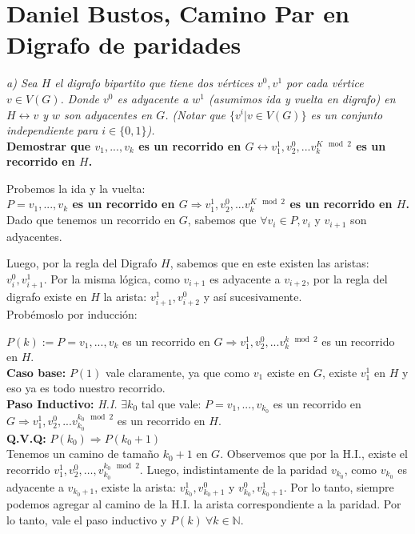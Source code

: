 \documentclass{article}
\begin{document}
\section{Daniel Bustos, Camino Par en Digrafo de paridades}
\textit{a) Sea $H$ el digrafo bipartito que tiene dos vértices $v^0, v^1$ por cada vértice $v \in V(G)$. Donde $v^0$ es adyacente a $w^1$ (asumimos ida y vuelta en digrafo) en $H \leftrightarrow v$ y $w$ son adyacentes en $G$. (Notar que $\{v^i | v \in V(G)\}$ es un conjunto independiente para $i \in \{0,1\}$).}\\

\textbf{Demostrar que $v_1,...,v_k$ es un recorrido en $G \leftrightarrow v^1_1,v^0_2,...v^{K \mod 2}_k$ es un recorrido en $H$.}

Probemos la ida y la vuelta:\\

\textbf{$P = v_1,...,v_k$ es un recorrido en $G \Rightarrow v^1_1,v^0_2,...v^{K \mod 2}_k$ es un recorrido en $H$.}\\

Dado que tenemos un recorrido en $G$, sabemos que $\forall v_i \in P, v_i$ y $v_{i+1}$ son adyacentes.

Luego, por la regla del Digrafo $H$, sabemos que en este existen las aristas: $v^0_i,v^1_{i+1}$. Por la misma lógica, como $v_{i+1}$ es adyacente a $v_{i+2}$, por la regla del digrafo existe en $H$ la arista: $v^1_{i+1},v^0_{i+2}$ y así sucesivamente.\\

Probémoslo por inducción:

$P(k) := P = v_1,...,v_k$ es un recorrido en $G \Rightarrow v^1_1,v^0_2,...v^{k \mod 2}_k$ es un recorrido en $H$.\\

\textbf{Caso base:}
$P(1)$ vale claramente, ya que como $v_1$ existe en $G$, existe $v^1_1$ en $H$ y eso ya es todo nuestro recorrido.\\

\textbf{Paso Inductivo:}
\textit{H.I.} $\exists k_0$ tal que vale: $P = v_1,...,v_{k_0}$ es un recorrido en $G \Rightarrow v^1_1,v^0_2,...v^{k_0 \mod 2}_{k_0}$ es un recorrido en $H$.\\

\textbf{Q.V.Q:} $P(k_0) \Rightarrow P(k_0 + 1)$ \\

Tenemos un camino de tamaño $k_0 + 1$ en $G$. Observemos que por la H.I., existe el recorrido $v^1_1,v^0_2,\ldots,v^{k_0 \mod 2}_{k_0}$. Luego, indistintamente de la paridad $v_{k_0}$, como $v_{k_0}$ es adyacente a $v_{k_0 + 1}$, existe la arista: $v^1_{k_0},v^0_{k_0 + 1}$ y $v^0_{k_0},v^1_{k_0 + 1}$. Por lo tanto, siempre podemos agregar al camino de la H.I. la arista correspondiente a la paridad. Por lo tanto, vale el paso inductivo y $P(k) \ \forall k \in \mathbb{N}$. \\
\end{document}
